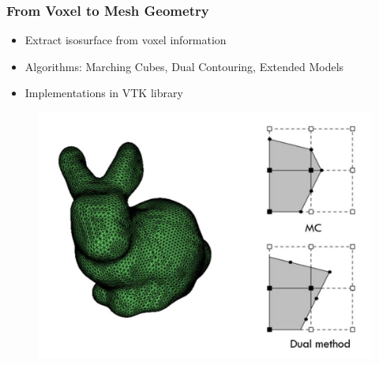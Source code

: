 \begin{frame}

	\frametitle{From Voxel to Mesh Geometry}
	\begin{minipage}{0.85\textwidth}
		\begin{itemize}
		\item Extract isosurface from voxel information
		\item Algorithms: Marching Cubes, Dual Contouring, Extended Models
		\item Implementations in VTK library
		\end{itemize}

		\begin{figure}
		\includegraphics[scale=0.4]{Pictures/bunny_MC.pdf}

		\end{figure}


\end{minipage}
\end{frame}
